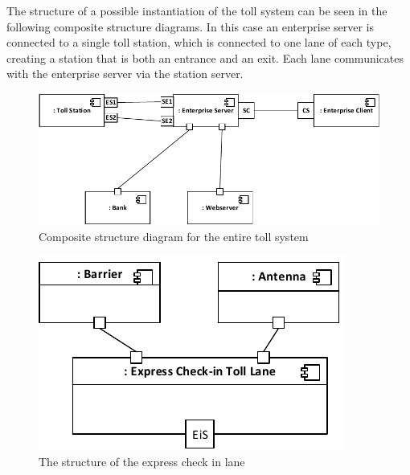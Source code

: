 The structure of a possible instantiation of the toll system can be seen in the following composite structure diagrams. In this case an enterprise server is connected to a single toll station, which is connected to one lane of each type, creating a station that is both an entrance and an exit. Each lane communicates with the enterprise server via the station server.
\\
\begin{figure}[H]
\centerline{\includegraphics[width=\textwidth]{img/composite_structure_diagrams/cscd_enterprise}}
\caption{Composite structure diagram for the entire toll system}
\label{fig:csd_e}
\end{figure}

\begin{figure}[H]
\centerline{\includegraphics[width=\textwidth]{img/composite_structure_diagrams/cscd_toll_lane_express_in}}
\caption{The structure of the express check in lane}
\label{fig:csd_tlei}
\end{figure}


